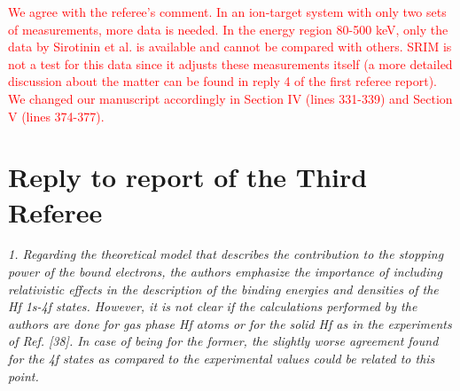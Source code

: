 \documentclass[a4paper,10pt]{article}
\def\reviewer#1{\vspace{0.35cm}\textsl{#1}}
\def\reply#1{\vspace{0.1cm}\textcolor{red}{#1}}
\begin{document}
\reply{We agree with the referee's comment. In an ion-target system with only two sets of measurements, more data is needed. In the energy region 80-500 keV, only the data by Sirotinin et al. is available and cannot be compared with others. SRIM is not a test for this data since it adjusts these measurements itself (a more detailed discussion about the matter can be found in reply 4 of the first referee report). We changed our manuscript accordingly in Section IV (lines 331-339) and Section V (lines 374-377).}

\newpage
\section{Reply to report of the Third Referee}
\reviewer{1. Regarding the theoretical model that describes the
contribution to the stopping power of the bound electrons, the authors
emphasize the importance of including relativistic effects in the
description of the binding energies and densities of the Hf 1s-4f
states. However, it is not clear if the calculations performed by the
authors are done for gas phase Hf atoms or for the solid Hf as in the
experiments of Ref. [38]. In case of being for the former, the slightly
worse agreement found for the 4f states as compared to the experimental
values could be related to this point.}
\end{document}
